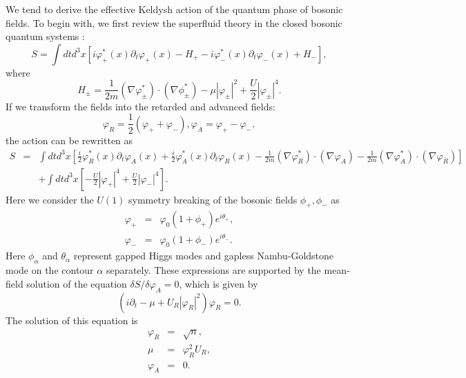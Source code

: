 \documentclass[aps,superscriptaddress,notitlepage,longbibliography]{revtex4-1}
\begin{document}
We tend to derive the effective Keldysh action of the quantum phase
of bosonic fields. To begin with, we first review the superfluid theory
in the closed bosonic quantum systems \citep{Ueda2010}: 
\begin{equation}
S=\int dtd^{3}x[i\varphi_{+}^{\ast}(x)\partial_{t}\varphi_{+}(x)-H_{+}-i\varphi_{-}^{\ast}(x)\partial_{t}\varphi_{-}(x)+H_{-}],\label{eq:closed_action}
\end{equation}
where 
\begin{equation}
H_{\pm}=\frac{1}{2m}(\nabla\varphi_{\pm}^{\ast})\cdot(\nabla\phi_{\pm}^{\ast})-\mu|\varphi_{\pm}|^{2}+\frac{U}{2}|\varphi_{\pm}|^{4}.
\end{equation}
If we transform the fields into the retarded and advanced fields:
\begin{equation}
\varphi_{R}=\frac{1}{2}(\varphi_{+}+\varphi_{-}),\varphi_{A}=\varphi_{+}-\varphi_{-},
\end{equation}
the action can be rewritten as 
\begin{eqnarray}
S & = & \int dtd^{3}x\left[\frac{i}{2}\varphi_{R}^{\ast}(x)\partial_{t}\varphi_{A}(x)+\frac{i}{2}\varphi_{A}^{\ast}(x)\partial_{t}\varphi_{R}(x)-\frac{1}{2m}(\nabla\varphi_{R}^{\ast})\cdot(\nabla\varphi_{A})-\frac{1}{2m}(\nabla\varphi_{A}^{\ast})\cdot(\nabla\varphi_{R})\right]\nonumber \\
 &  & +\int dtd^{3}x\left[-\frac{U}{2}|\varphi_{+}|^{4}+\frac{U}{2}|\varphi_{-}|^{4}\right].
\end{eqnarray}
Here we consider the $U(1)$ symmetry breaking of the bosonic fields
$\phi_{+},\phi_{-}$ as \citep{PhysRevD.103.056020}
\begin{eqnarray}
\varphi_{+} & = & \varphi_{0}(1+\phi_{+})e^{i\theta_{+}},\label{eq:phi+}\\
\varphi_{-} & = & \varphi_{0}(1+\phi_{-})e^{i\theta_{-}}.\label{eq:phi-}
\end{eqnarray}
Here $\phi_{\alpha}$ and $\theta_{\alpha}$ represent gapped Higgs
modes and gapless Nambu-Goldstone mode on the contour $\alpha$ separately.
These expressions are supported by the mean-field solution of the
equation $\delta S/\delta\varphi_{A}=0$, which is given by 
\begin{equation}
(i\partial_{t}-\mu+U_{R}|\varphi_{R}|^{2})\varphi_{R}=0.
\end{equation}
The solution of this equation is 
\begin{eqnarray*}
\varphi_{R} & = & \sqrt{n},\\
\mu & = & \varphi_{R}^{2}U_{R},\\
\varphi_{A} & = & 0.
\end{eqnarray*}
\end{document}
